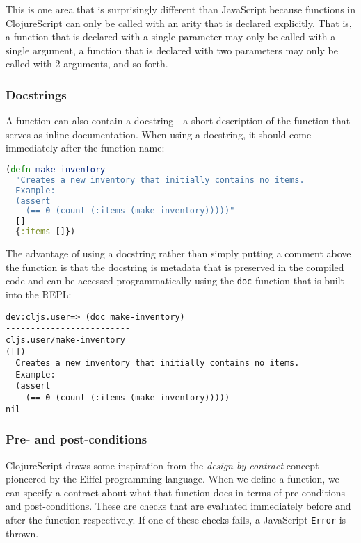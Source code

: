 \documentclass[10pt,twoside,openright]{memoir}
\begin{document}
This is one area that is surprisingly different than JavaScript because
functions in ClojureScript can only be called with an arity that is
declared explicitly. That is, a function that is declared with a single
parameter may only be called with a single argument, a function that is
declared with two parameters may only be called with 2 arguments, and so
forth.

\subsubsection{Docstrings}

A function can also contain a docstring - a short description of the
function that serves as inline documentation. When using a docstring, it
should come immediately after the function name:

\begin{lstlisting}[language=Clojure, caption={Documenting a function}]
(defn make-inventory
  "Creates a new inventory that initially contains no items.
  Example:
  (assert
    (== 0 (count (:items (make-inventory)))))"
  []
  {:items []})
\end{lstlisting}

The advantage of using a docstring rather than simply putting a comment
above the function is that the docstring is metadata that is preserved
in the compiled code and can be accessed programmatically using the
\texttt{doc} function that is built into the REPL:

\begin{verbatim}
dev:cljs.user=> (doc make-inventory)
-------------------------
cljs.user/make-inventory
([])
  Creates a new inventory that initially contains no items.
  Example:
  (assert
    (== 0 (count (:items (make-inventory)))))
nil
\end{verbatim}


\subsubsection{Pre- and post-conditions}

ClojureScript draws some inspiration from the \emph{design by contract}
concept pioneered by the Eiffel
programming language. When we define a function, we can specify a
contract about what that function does in terms of pre-conditions and
post-conditions. These are checks that are evaluated immediately before
and after the function respectively. If one of these checks fails, a
JavaScript \texttt{Error} is thrown.
\end{document}
